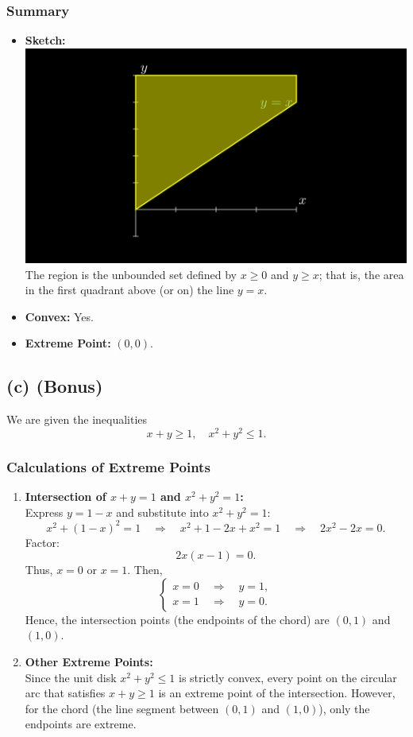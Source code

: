 \documentclass{article}
\begin{document}
\subsubsection*{Summary}
\begin{itemize}
    \item \textbf{Sketch:}\\[0.5em]
    \includegraphics[width=0.8\linewidth]{SystemBScene.png}\\[0.5em]
    The region is the unbounded set defined by \(x\ge 0\) and \(y\ge x\); that is, the area in the first quadrant above (or on) the line \(y=x\).
    \item \textbf{Convex:} Yes.
    \item \textbf{Extreme Point:} \((0,0)\).
\end{itemize}

\subsection*{(c) (Bonus)}
We are given the inequalities
\[
x+y \ge 1,\quad x^2+y^2 \le 1.
\]

\subsubsection*{Calculations of Extreme Points}
\begin{enumerate}
    \item \textbf{Intersection of \(x+y=1\) and \(x^2+y^2=1\):}\\
    Express \(y=1-x\) and substitute into \(x^2+y^2=1\):
    \[
    x^2+(1-x)^2=1\quad\Longrightarrow\quad x^2+1-2x+x^2=1\quad\Longrightarrow\quad 2x^2-2x=0.
    \]
    Factor:
    \[
    2x(x-1)=0.
    \]
    Thus, \(x=0\) or \(x=1\). Then,
    \[
    \begin{cases}
    x=0 \quad \Rightarrow \quad y=1,\\[1mm]
    x=1 \quad \Rightarrow \quad y=0.
    \end{cases}
    \]
    Hence, the intersection points (the endpoints of the chord) are \((0,1)\) and \((1,0)\).
    
    \item \textbf{Other Extreme Points:}\\
    Since the unit disk \(x^2+y^2\le1\) is strictly convex, every point on the circular arc that satisfies \(x+y\ge1\) is an extreme point of the intersection. However, for the chord (the line segment between \((0,1)\) and \((1,0)\)), only the endpoints are extreme.
\end{enumerate}
\end{document}
